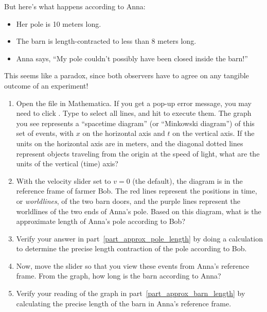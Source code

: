 But here's what happens according to Anna:
\begin{itemize}[nosep]
\item Her pole is 10 meters long.
\item The barn is length-contracted to less than 8 meters long.
\item Anna says, ``My pole couldn't possibly have been closed inside the barn!''
\end{itemize}

This seems like a paradox, since both observers have to agree on any tangible outcome of an experiment!

\begin{enumerate}
\item Open the file  in Mathematica. If you get a pop-up error message, you may need to click . Type  to select all lines, and hit  to execute them. The graph you see represents a ``spacetime diagram'' (or ``Minkowski diagram'') of this set of events, with $x$ on the horizontal axis and $t$ on the vertical axis. If the units on the horizontal axis are in meters, and the diagonal dotted lines represent objects traveling from the origin at the speed of light, what are the units of the vertical (time) axis?
\answerspace{0.5in}

\item With the velocity slider set to $v = 0$ (the default), the diagram is in the reference frame of farmer Bob. The red lines represent the positions in time, or \textit{worldlines}, of the two barn doors, and the purple lines represent the worldlines of the two ends of Anna's pole. Based on this diagram, what is the approximate length of Anna's pole according to Bob?  \label{part_approx_pole_length}
\answerspace{0.5in}

\item Verify your answer in part~\ref{part_approx_pole_length} by doing a calculation to determine the precise length contraction of the pole according to Bob.
\answerspace{0.6in}

\item Now, move the slider so that you view these events from Anna's reference frame.
From the graph, how long is the barn according to Anna? \label{part_approx_barn_length}
\answerspace{0.5in}

\item Verify your reading of the graph in part~\ref{part_approx_barn_length} by calculating the precise length of the barn in Anna's reference frame.
\answerspace{0.6in}


\end{enumerate}
